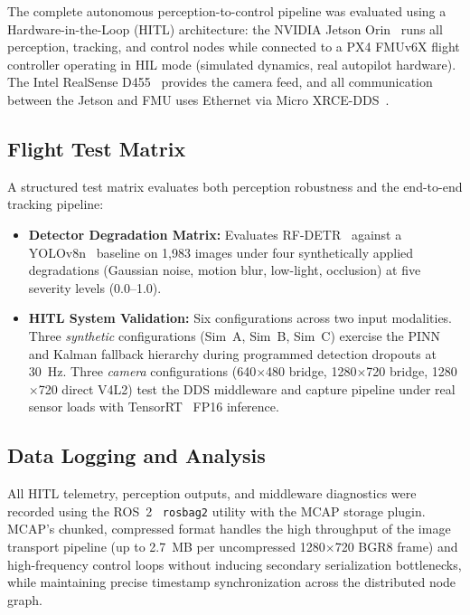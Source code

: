 \documentclass[11pt,letterpaper]{article}
\begin{document}
The complete autonomous perception-to-control pipeline was evaluated
using a Hardware-in-the-Loop (HITL) architecture: the NVIDIA Jetson
Orin~\cite{jetsonorin} runs all perception, tracking, and control
nodes while connected to a PX4 FMUv6X flight controller operating in
HIL mode (simulated dynamics, real autopilot hardware).  The Intel
RealSense D455~\cite{realsensed455} provides the camera feed, and all
communication between the Jetson and FMU uses Ethernet via Micro
XRCE-DDS~\cite{eprosimadds}.

\subsection{Flight Test Matrix}

A structured test matrix evaluates both perception robustness and the
end-to-end tracking pipeline:
\begin{itemize}
    \item \textbf{Detector Degradation Matrix:} Evaluates RF-DETR~\cite{rfdetr2025} against a YOLOv8n~\cite{ultralytics2023} baseline on 1{,}983 images under four synthetically applied degradations (Gaussian noise, motion blur, low-light, occlusion) at five severity levels (0.0--1.0).
    \item \textbf{HITL System Validation:} Six configurations across two input modalities.  Three \emph{synthetic} configurations (Sim~A, Sim~B, Sim~C) exercise the PINN and Kalman fallback hierarchy during programmed detection dropouts at 30~Hz.  Three \emph{camera} configurations (640$\times$480 bridge, 1280$\times$720 bridge, 1280$\times$720 direct V4L2) test the DDS middleware and capture pipeline under real sensor loads with TensorRT~\cite{tensorrt} FP16 inference.
\end{itemize}

\subsection{Data Logging and Analysis}

All HITL telemetry, perception outputs, and middleware diagnostics were
recorded using the ROS~2~\cite{ros2humble} \texttt{rosbag2} utility
with the MCAP storage plugin.  MCAP's chunked, compressed format
handles the high throughput of the image transport pipeline (up to
2.7~MB per uncompressed 1280$\times$720 BGR8 frame) and high-frequency
control loops without inducing secondary serialization bottlenecks,
while maintaining precise timestamp synchronization across the
distributed node graph.
\end{document}
